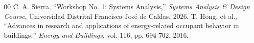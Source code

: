 \documentclass[conference]{IEEEtran}
\begin{document}
\begin{thebibliography}{00}
 C. A. Sierra, ``Workshop No. 1: Systems Analysis,'' \textit{Systems Analysis \& Design Course}, Universidad Distrital Francisco José de Caldas, 2026.
 T. Hong, et al., ``Advances in research and applications of energy-related occupant behavior in buildings,'' \textit{Energy and Buildings}, vol. 116, pp. 694-702, 2016.
\end{thebibliography}
\end{document}
